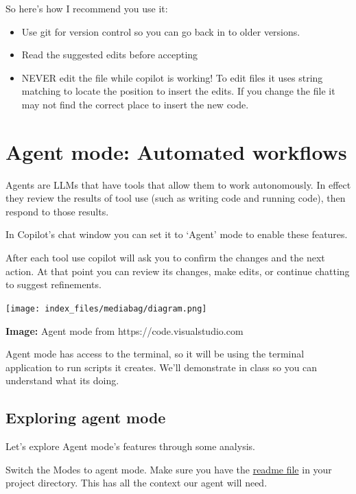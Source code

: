 \documentclass[
  letterpaper,
  DIV=11,
  numbers=noendperiod]{scrreprt}
\providecommand{\tightlist}{%
  \setlength{\itemsep}{0pt}\setlength{\parskip}{0pt}}\usepackage{longtable,booktabs,array}
\begin{document}
So here's how I recommend you use it:

\begin{itemize}
\tightlist
\item
  Use git for version control so you can go back in to older versions.
\item
  Read the suggested edits before accepting
\item
  NEVER edit the file while copilot is working! To edit files it uses
  string matching to locate the position to insert the edits. If you
  change the file it may not find the correct place to insert the new
  code.
\end{itemize}

\section{Agent mode: Automated
workflows}\label{agent-mode-automated-workflows}

Agents are LLMs that have tools that allow them to work autonomously. In
effect they review the results of tool use (such as writing code and
running code), then respond to those results.

In Copilot's chat window you can set it to `Agent' mode to enable these
features.

After each tool use copilot will ask you to confirm the changes and the
next action. At that point you can review its changes, make edits, or
continue chatting to suggest refinements.

\texttt{[image: index\_files/mediabag/diagram.png]}

\textbf{Image:} Agent mode from https://code.visualstudio.com

Agent mode has access to the terminal, so it will be using the terminal
application to run scripts it creates. We'll demonstrate in class so you
can understand what its doing.

\subsection{Exploring agent mode}\label{exploring-agent-mode}

Let's explore Agent mode's features through some analysis.

Switch the Modes to agent mode. Make sure you have the
\href{https://raw.githubusercontent.com/cbrown5/example-ecological-data/refs/heads/main/data/benthic-reefs-and-fish/readme.md}{readme
file} in your project directory. This has all the context our agent will
need.
\end{document}
